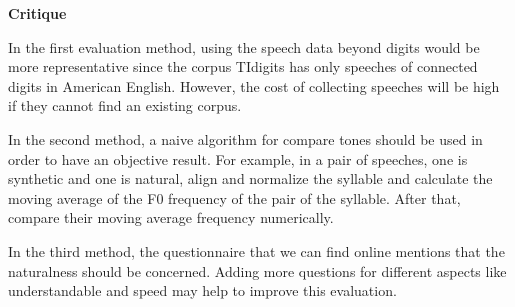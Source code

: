 \documentclass[12pt]{article}
\newenvironment{problem}[2][Problem]{\begin{trivlist}
\item[\hskip \labelsep {\bfseries #1}\hskip \labelsep {\bfseries #2.}]}{\end{trivlist}}
\begin{document}
\begin{problem}{5.3}
\noindent\textbf{Critique}

    In the first evaluation method, using the speech data beyond digits would 
    be more representative since the corpus TIdigits has only speeches of
    connected digits in American English. However, the cost of collecting speeches
    will be high if they cannot find an existing corpus.

    In the second method, a naive algorithm for compare tones should be used in 
    order to have an objective result. For example, in a pair of speeches, 
    one is synthetic and one is natural, align and normalize the syllable 
    and calculate the moving average of the F0 frequency of the pair of the syllable.
    After that, compare their moving average frequency numerically.

    In the third method, the questionnaire that we can find online mentions
    that the naturalness should be concerned. Adding more questions for different
    aspects like understandable and speed may help to improve this evaluation.
\end{problem}
\pagebreak



\end{document}
